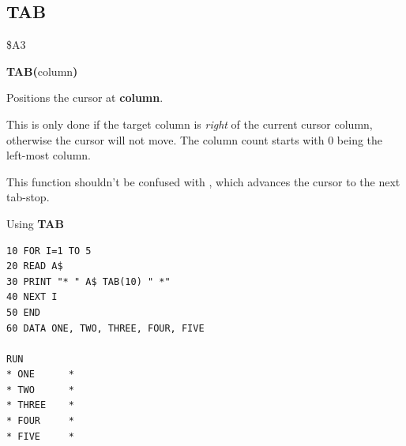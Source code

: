 \subsection{TAB}
\begin{description}[leftmargin=2cm,style=nextline]
\item [Token:]    \$A3

\item [Format:]   {\bf TAB(}column{\bf)}

\item [Returns:]  Positions the cursor at {\bf column}.

                  This is only done if the target column is {\it right} of the current cursor column, otherwise the cursor will not move. The column count starts with 0 being the left-most column.

\item [Remarks:]  This function shouldn't be confused with , which advances the cursor to the next tab-stop.

\item [Example:]  Using {\bf TAB}

\begin{tcolorbox}[colback=black,coltext=white]
\verbatimfont{\codefont}
\begin{verbatim}
10 FOR I=1 TO 5
20 READ A$
30 PRINT "* " A$ TAB(10) " *"
40 NEXT I
50 END
60 DATA ONE, TWO, THREE, FOUR, FIVE

RUN
* ONE      *
* TWO      *
* THREE    *
* FOUR     *
* FIVE     *
\end{verbatim}
\end{tcolorbox}
\end{description}


\newpage
